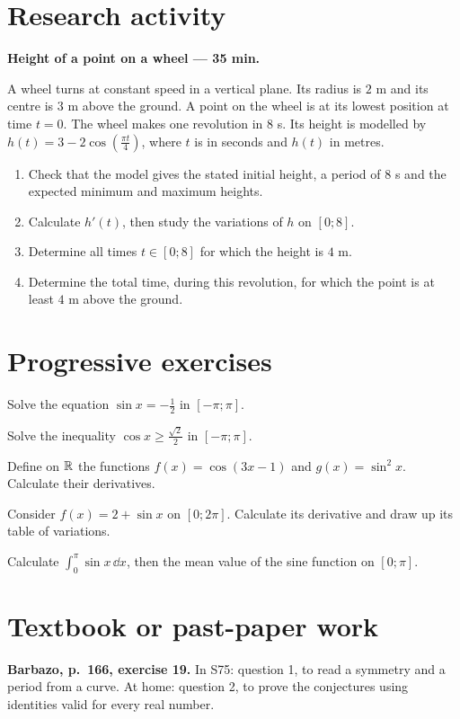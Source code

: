 \section{Research activity}\textbf{Height of a point on a wheel --- 35 min.}\par A wheel turns at constant speed in a vertical plane. Its radius is $2$ m and its centre is $3$ m above the ground. A point on the wheel is at its lowest position at time $t=0$. The wheel makes one revolution in $8$ s. Its height is modelled by $h(t)=3-2\cos\left(\frac{\pi t}{4}\right)$, where $t$ is in seconds and $h(t)$ in metres.
\begin{enumerate}\item Check that the model gives the stated initial height, a period of $8$ s and the expected minimum and maximum heights.
\item Calculate $h' (t)$, then study the variations of $h$ on $[0;8]$.
\item Determine all times $t\in[0;8]$ for which the height is $4$ m.
\item Determine the total time, during this revolution, for which the point is at least $4$ m above the ground.\end{enumerate}

\section{Progressive exercises}

Solve the equation $\sin x=-\frac12$ in $[-\pi;\pi]$.

Solve the inequality $\cos x\ge\frac{\sqrt2}{2}$ in $[-\pi;\pi]$.

Define on $\mathbb R$ the functions $f(x)=\cos(3x-1)$ and $g(x)=\sin^2x$. Calculate their derivatives.

Consider $f(x)=2+\sin x$ on $[0;2\pi]$. Calculate its derivative and draw up its table of variations.

Calculate $\displaystyle\int_0^\pi\sin x\,\dd x$, then the mean value of the sine function on $[0;\pi]$.

\section{Textbook or past-paper work}\textbf{Barbazo, p.~166, exercise 19.} In S75: question 1, to read a symmetry and a period from a curve. At home: question 2, to prove the conjectures using identities valid for every real number.

